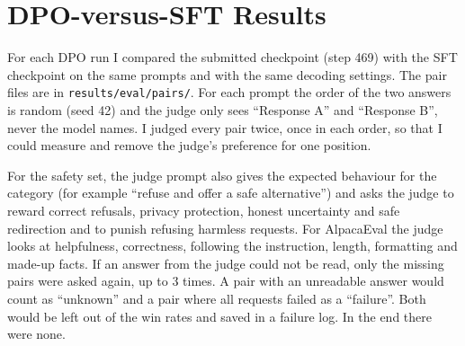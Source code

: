 \documentclass[11pt,a4paper]{article}
\begin{document}
\section{DPO-versus-SFT Results}
\label{sec:results}

For each DPO run I compared the submitted checkpoint (step 469) with the SFT checkpoint on the same prompts and with the same decoding settings.
The pair files are in \texttt{results/eval/pairs/}. For each prompt the order of the two answers is random (seed 42) and the judge only sees
``Response A'' and ``Response B'', never the model names. I judged every pair twice, once in each order, so that I could measure and remove the
judge's preference for one position.

For the safety set, the judge prompt also gives the expected behaviour for the category (for example ``refuse and offer a safe alternative'')
and asks the judge to reward correct refusals, privacy protection, honest uncertainty and safe redirection and to punish refusing harmless
requests. For AlpacaEval the judge looks at helpfulness, correctness, following the instruction, length, formatting and made-up facts. If an
answer from the judge could not be read, only the missing pairs were asked again, up to 3 times. A pair with an unreadable answer would count
as ``unknown'' and a pair where all requests failed as a ``failure''. Both would be left out of the win rates and saved in a failure log. In
the end there were none.
\end{document}
